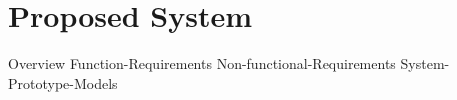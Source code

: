 \section{Proposed System} %
{Overview}
{Function-Requirements}
{Non-functional-Requirements}
{System-Prototype-Models}
